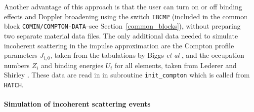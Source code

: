 Another advantage of this approach is that the user can
turn on or off binding effects and Doppler broadening
using the switch {\tt IBCMP} (included in the common
block {\tt COMIN/COMPTON-DATA}--see Section~\ref{common_blocks}),
without preparing two
separate material data files. The only additional data
needed to simulate incoherent scattering in the impulse
approximation are the Compton profile parameters
$J_{i,0}$, taken from the tabulations by Biggs {\em et al}
\cite{BM75}, and the occupation numbers $Z_i$ and
binding energies $U_i$ for all elements, taken from
Lederer and Shirley \cite{LS78}. These data are read in
in subroutine {\tt init\_compton} which is called from
{\tt HATCH}.

\paragraph{Simulation of incoherent scattering events}\hfill
{}

